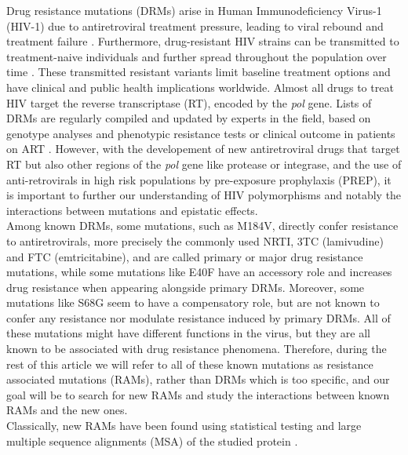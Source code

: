 \documentclass[
  11,
]{scrbook}
\begin{document}
Drug resistance mutations (DRMs) arise in Human Immunodeficiency Virus-1
(HIV-1) due to antiretroviral treatment pressure, leading to viral
rebound and treatment failure
\autocite{lepriResistanceProfilesPatients2000,verhofstedeDetectionDrugResistance2007}.
Furthermore, drug-resistant HIV strains can be transmitted to
treatment-naive individuals and further spread throughout the population
over time
\autocite{hueDemonstrationSustainedDrugResistant2009,mouradPhylotypebasedAnalysisHighlights2015,zhukovaRolePhylogeneticsTool2017}.
These transmitted resistant variants limit baseline treatment options
and have clinical and public health implications worldwide. Almost all
drugs to treat HIV target the reverse transcriptase (RT), encoded by the
\emph{pol} gene. Lists of DRMs are regularly compiled and updated by experts
in the field, based on genotype analyses and phenotypic resistance tests
or clinical outcome in patients on ART
\autocite{bennettDrugResistanceMutations2009,hammondMutationsRetroviralGenes1998,wensing2017UpdateDrug2016}.
However, with the developement of new antiretroviral drugs that target
RT but also other regions of the \emph{pol} gene like protease or integrase,
and the use of anti-retrovirals in high risk populations by pre-exposure
prophylaxis (PREP), it is important to further our understanding of HIV
polymorphisms and notably the interactions between mutations and
epistatic effects.\\
Among known DRMs, some mutations, such as M184V, directly confer
resistance to antiretrovirals, more precisely the commonly used NRTI,
3TC (lamivudine) and FTC (emtricitabine), and are called primary or
major drug resistance mutations, while some mutations like E40F have an
accessory role and increases drug resistance when appearing alongside
primary DRMs. Moreover, some mutations like S68G seem to have a
compensatory role, but are not known to confer any resistance nor
modulate resistance induced by primary DRMs. All of these mutations
might have different functions in the virus, but they are all known to
be associated with drug resistance phenomena. Therefore, during the rest
of this article we will refer to all of these known mutations as
resistance associated mutations (RAMs), rather than DRMs which is too
specific, and our goal will be to search for new RAMs and study the
interactions between known RAMs and the new ones.\\
Classically, new RAMs have been found using statistical testing and
large multiple sequence alignments (MSA) of the studied protein
\autocite{dudoitMultipleTestingProcedures2007,villabona-arenasIndepthAnalysisHIV12016}.
\end{document}
